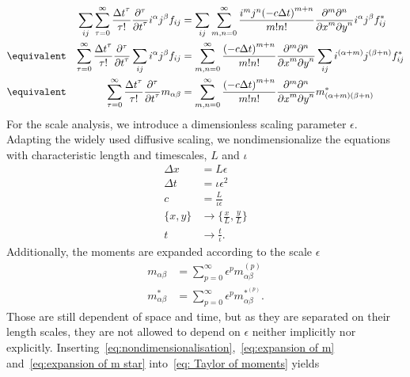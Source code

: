 \begin{align}
    \nonumber
    & & \sum_{ij} \sum_{\tau = 0}^\infty \frac{{\Delta t}^\tau }{\tau!} \frac{\partial^\tau}{{\partial t}^\tau} i^\alpha j^\beta f_{ij} &=
    \sum_{ij}\sum_{m,n = 0}^\infty \frac{i^m j^n {(-c\Delta t)}^{m+n}} {m!n!} \frac{\partial^m \partial^n}{ {\partial x}^m{\partial y}^n}i^\alpha j^\beta f^*_{ij}\\
    \nonumber
    &\equivalent &
    \sum_{\tau = 0}^\infty \frac{{\Delta t}^\tau }{\tau!} \frac{\partial^\tau}{{\partial t}^\tau} \sum_{ij}i^\alpha j^\beta f_{ij} &=
    \sum_{m,n = 0}^\infty \frac{{(-c\Delta t)}^{m+n}} {m!n!} \frac{\partial^m \partial^n}{ {\partial x}^m{\partial y}^n}\sum_{ij}i^{(\alpha + m)} j^{(\beta+n)} f^*_{ij}\\
      \label{eq: Taylor of moments}
     &\equivalent &
     \sum_{\tau = 0}^\infty \frac{{\Delta t}^\tau }{\tau!} \frac{\partial^\tau}{{\partial t}^\tau} m_{\alpha\beta} &=
    \sum_{m,n = 0}^\infty \frac{{(-c\Delta t)}^{m+n}} {m!n!} \frac{\partial^m \partial^n}{ {\partial x}^m{\partial y}^n} m^*_{(\alpha + m)(\beta + n)}
\end{align}
For the scale analysis, we introduce a dimensionless scaling parameter $\epsilon$.
Adapting the widely used diffusive scaling, we nondimensionalize the equations with characteristic length and timescales, $L$ and $\iota$
\begin{equation}
  \label{eq:nondimensionalisation}
  \begin{aligned}
    \Delta x & = L\epsilon \\
    \Delta t & = \iota\epsilon^2 \\
    c & = \frac{L}{\iota\epsilon} \\
    \{x, y\} & \rightarrow \{\frac{x}{L}, \frac{y}{L}\} \\
    t & \rightarrow \frac{t}{\iota}.
  \end{aligned}
\end{equation}
Additionally, the moments are expanded according to the scale $\epsilon$
\begin{align}
    \label{eq:expansion of m}
    m_{\alpha\beta} & = \sum_{p=0}^{\infty} \epsilon^p m_{\alpha\beta}^{(p)} \\
    \label{eq:expansion of m star}
    m^*_{\alpha\beta} & = \sum_{p=0}^{\infty} \epsilon^p m_{\alpha\beta}^{*^{(p)}}.
\end{align}
Those are still dependent of space and time, but as they are separated on their length scales, they are not allowed to depend on $\epsilon$ neither implicitly nor explicitly.
Inserting~\eqref{eq:nondimensionalisation},~\eqref{eq:expansion of m} and~\eqref{eq:expansion of m star} into~\eqref{eq: Taylor of moments} yields

